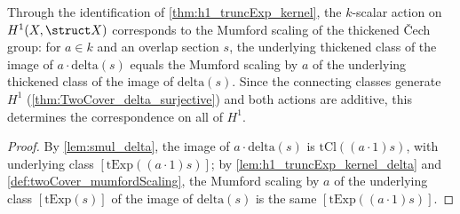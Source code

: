 \begin{theorem}
  \label{thm:mumfordScaling_equivariance}
  \leanok
  Through the identification of \ref{thm:h1_truncExp_kernel}, the \(k\)-scalar action
  on \(H^1(X, \struct X)\) corresponds to the Mumford scaling of the thickened
  \v{C}ech group: for \(a \in k\) and an overlap section \(s\), the underlying
  thickened class of the image of \(a \cdot \mathrm{delta}(s)\) equals the Mumford
  scaling by \(a\) of the underlying thickened class of the image of
  \(\mathrm{delta}(s)\). Since the connecting classes generate \(H^1\)
  (\ref{thm:TwoCover_delta_surjective}) and both actions are additive, this determines
  the correspondence on all of \(H^1\).
\end{theorem}
\begin{proof}
  \leanok
  By \ref{lem:smul_delta}, the image of \(a \cdot \mathrm{delta}(s)\) is
  \(\mathrm{tCl}((a \cdot 1) s)\), with underlying class
  \([\mathrm{tExp}((a \cdot 1) s)]\); by \ref{lem:h1_truncExp_kernel_delta} and
  \ref{def:twoCover_mumfordScaling}, the Mumford scaling by \(a\) of the underlying
  class \([\mathrm{tExp}(s)]\) of the image of \(\mathrm{delta}(s)\) is the same
  \([\mathrm{tExp}((a \cdot 1) s)]\).
\end{proof}
